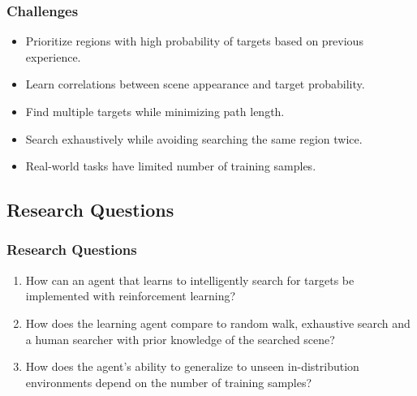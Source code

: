 \begin{frame}
    \frametitle{Challenges}

    \begin{itemize}
        \item Prioritize regions with high probability of targets based on previous experience.
        \item Learn correlations between scene appearance and target probability.
        \item Find multiple targets while minimizing path length.
        \item Search exhaustively while avoiding searching the same region twice.
        \item Real-world tasks have limited number of training samples.
    \end{itemize}
\end{frame}

\subsection{Research Questions}

\begin{frame}
    \frametitle{Research Questions}
    \begin{enumerate}
        \item How can an agent that learns to intelligently search for targets be implemented with reinforcement learning?
        \item How does the learning agent compare to random walk, exhaustive search and a human searcher with prior knowledge of the searched scene?
        \item How does the agent's ability to generalize to unseen in-distribution environments depend on the number of training samples?
    \end{enumerate}    
\end{frame}